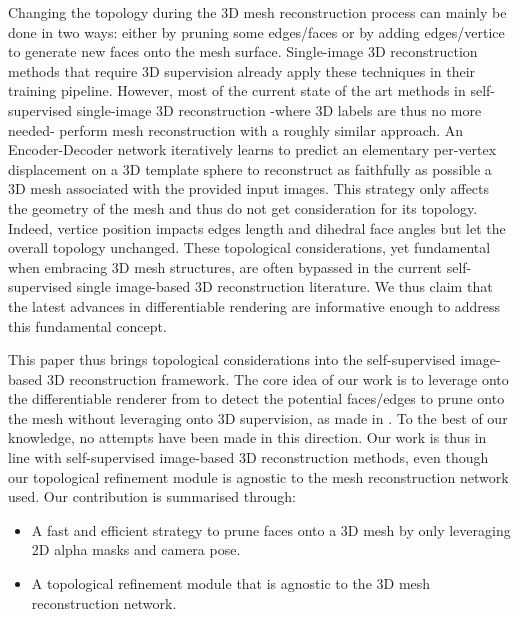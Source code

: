Changing the topology during the 3D mesh reconstruction process can mainly be done in two ways: either by pruning some edges/faces or by adding edges/vertice to generate new faces onto the mesh surface. Single-image 3D reconstruction methods that require 3D supervision already apply these techniques in their training pipeline\citep{pan2019deep,nie2020total3dunderstanding,smith2019geometrics}. However, most of the current state of the art methods in self-supervised single-image 3D reconstruction -where 3D labels are thus no more needed- perform mesh reconstruction with a roughly similar approach. An Encoder-Decoder network iteratively learns to predict an elementary per-vertex displacement on a 3D template sphere to reconstruct as faithfully as possible a 3D mesh associated with the provided input images. This strategy only affects the geometry of the mesh and thus do not get consideration for its topology. Indeed, vertice position impacts edges length and dihedral face angles but let the overall topology unchanged. These topological considerations, yet fundamental when embracing 3D mesh structures, are often bypassed in the current self-supervised single image-based 3D reconstruction literature. We thus claim that the latest advances in differentiable rendering \citep{liu1029soft,ravi2020accelarating} are informative enough to address this fundamental concept.

This paper thus brings topological considerations into the self-supervised image-based 3D reconstruction framework. The core idea of our work is to leverage onto the differentiable renderer from \citep{ravi2020accelarating} to detect the potential faces/edges to prune onto the mesh without leveraging onto 3D supervision, as made in \citep{pan2019deep,nie2020total3dunderstanding,smith2019geometrics}. To the best of our knowledge, no attempts have been made in this direction. Our work is thus in line with self-supervised image-based 3D reconstruction methods, even though our topological refinement module is agnostic to the mesh reconstruction network used. Our contribution is summarised through: 
\begin{itemize}
    
    \item A fast and efficient strategy to prune faces onto a 3D mesh by only leveraging 2D alpha masks and camera pose. 

    \item A topological refinement module that is agnostic to the 3D mesh reconstruction network.
\end{itemize}

